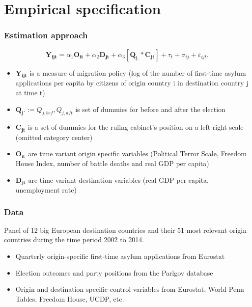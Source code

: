 \documentclass[compress, xcolor = {table,xcdraw}]{beamer}
\begin{document}
\section{Empirical specification}
\begin{frame}
\frametitle{Estimation approach}
\begin{equation}
\mathbf{Y_{ijt}} =\alpha_1 \mathbf{O_{it}} + \alpha_2 \mathbf{D_{jt}} + \alpha_3 [\mathbf{Q_{j.}} *  \mathbf{C_{jt}}] + \tau_t + \sigma_{ij} +  \varepsilon_{ijt},
\end{equation}
\smallskip
\begin{itemize}
	\small
	\item $\mathbf{Y_{ijt}}$ is a measure of migration policy (log of the number of first-time asylum applications per capita by citizens of origin country i in destination country j at time t)
	\item $\mathbf{Q_j.} := Q_{j,bef}, Q_{j,aft}$ is set of dummies for before and after the election
	\item $\mathbf{C_{jt}}$ is a set of dummies for the ruling cabinet's position on a left-right scale (omitted category center)
	\item $\mathbf{O_{it}}$ are time variant origin specific variables (Political Terror Scale, Freedom House Index, number of battle deaths and real GDP per capita) 
	\item $\mathbf{D_{jt}}$  are time variant destination variables (real GDP per capita, unemployment rate)
\end{itemize}
\end{frame}


\begin{frame}
\frametitle{Data}
Panel of 12 big European destination countries and their 51 most relevant origin countries during the time period 2002 to 2014.
\smallskip
\begin{itemize}
	\item Quarterly origin-specific first-time asylum applications from Eurostat
	\item Election outcomes and party positions from the Parlgov database
	\item Origin and destination specific control variables from Eurostat, World Penn Tables, Freedom House, UCDP, etc.
\end{itemize}
\end{frame}
\end{document}

